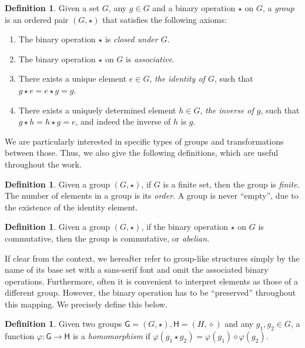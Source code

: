\documentclass[12pt, a4paper, oneside]{memoir}
\theoremstyle{definition}
\newtheorem{definition}[theorem]{Definition}
\begin{document}
\begin{definition}
  Given a set $G$, any $g \in G$ and a binary operation $\star$ on $G$, a \emph{group} is an ordered pair $(G, \star)$ that satisfies the following axioms:
  
  \begin{enumerate}
    \item The binary operation $\star$ is \emph{closed under $G$}.
    \item The binary operation $\star$ on $G$ is \emph{associative}.
    \item There exists a unique element $e \in G$, \emph{the identity of $G$}, such that $g \star e = e \star g = g$.
    \item There exists a uniquely determined element $h \in G$, \emph{the inverse of $g$}, such that $g \star h = h \star g = e$, and indeed the inverse of $h$ is $g$.
  \end{enumerate}
\end{definition}

We are particularly interested in specific types of groups and transformations between those. Thus, we also give the following definitions, which are useful throughout the work.

\begin{definition}
  Given a group $(G, \star)$, if $G$ is a finite set, then the group is \emph{finite}. The number of elements in a group is its \emph{order}. A group is never ``empty'', due to the existence of the identity element.
\end{definition}

\begin{definition}
  Given a group $(G, \star)$, if the binary operation $\star$ on $G$ is commutative, then the group is commutative, or \emph{abelian}.
\end{definition}

If clear from the context, we hereafter refer to group-like structures simply by the name of its base set with a sans-serif font and omit the associated binary operations. Furthermore, often it is convenient to interpret elements as those of a different group. However, the binary operation has to be ``preserved'' throughout this mapping. We precisely define this below.

\begin{definition}\label{def:group-hom}
  Given two groups $\mathsf{G} = (G, \star), \mathsf{H} = (H, \diamond)$ and any $g_{1}, g_{2} \in G$, a function $\varphi : \mathsf{G} \to \mathsf{H}$ is a \emph{homomorphism} if $\varphi(g_{1} \star g_{2}) = \varphi(g_{1}) \diamond \varphi(g_{2})$.
\end{definition}
\end{document}
